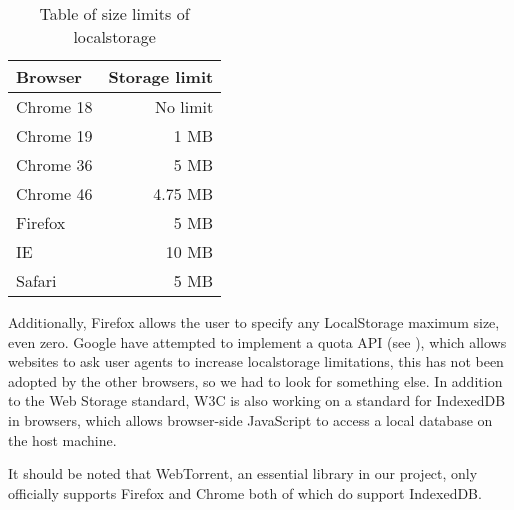 \begin{table}[H]
	\centering
	\begin{tabular}{l | r}
        Browser   & Storage limit \\ \hline
		Chrome 18 & No limit  \\
		Chrome 19 & 1    MB   \\
		Chrome 36 & 5    MB   \\
		Chrome 46 & 4.75 MB   \\
		Firefox   & 5    MB   \\
		IE        & 10   MB   \\
		Safari    & 5    MB   \\
	\end{tabular}
	\caption{Table of size limits of localstorage}
	\label{table:browserls}
\end{table}

Additionally, Firefox allows the user to specify any LocalStorage maximum size, even zero. 
Google have attempted to implement a quota \acs{API} (see \citep{QuotaAPI}), 
which allows websites to ask user agents to increase localstorage limitations,
this has not been adopted by the other browsers, so we had to look for something else.
\newline\newline
In addition to the Web Storage standard, W3C is also working on a standard for IndexedDB in browsers, 
which allows browser-side JavaScript to access a local database on the host machine.

It should be noted that WebTorrent, 
an essential library in our project, 
only officially supports Firefox and Chrome 
both of which do support IndexedDB.

